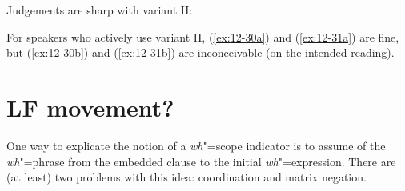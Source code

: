 \documentclass[output=paper]{langsci/langscibook}
\begin{document}
Judgements are sharp with variant II:
\begin{exe}
\ex
\label{ex:12-30}
\begin{xlist}
\end{xlist}
\ex
\label{ex:12-31}
\begin{xlist}
\end{xlist}
\end{exe}
For speakers who actively use variant II, (\ref{ex:12-30a}) and (\ref{ex:12-31a}) are fine, but
(\ref{ex:12-30b}) and (\ref{ex:12-31b}) are inconceivable (on the intended reading).

\section{LF movement?}
\label{sec:12-7}

One way to explicate the notion of a \emph{wh}"=scope indicator is to assume  of the \emph{wh}"=phrase from the embedded clause to the initial
\emph{wh}"=expression. There are (at least) two problems with this idea: coordination
and matrix negation.
\end{document}
